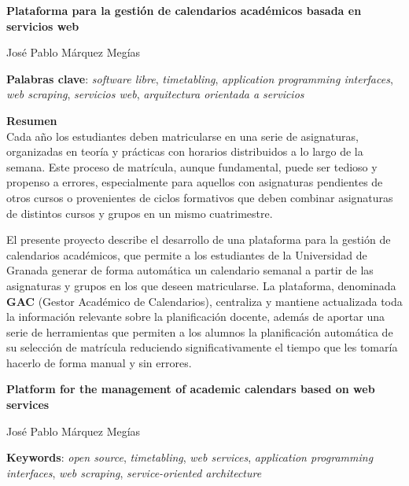 \thispagestyle{empty}

\begin{center}
	\newpage
{\large\bfseries Plataforma para la gestión de calendarios académicos basada en servicios web}\\
\end{center}
\begin{center}
José Pablo Márquez Megías\\
\end{center}


\vspace{0.5cm}
\noindent\textbf{Palabras clave}: \textit{software libre}, \textit{timetabling}, \textit{application programming interfaces}, \textit{web scraping}, \textit{servicios web}, \textit{arquitectura orientada a servicios}
\vspace{0.7cm}

\noindent\textbf{Resumen}\\

Cada año los estudiantes deben matricularse en una serie de asignaturas, organizadas en teoría y prácticas con horarios distribuidos a lo largo de la semana. Este proceso de matrícula, aunque fundamental, puede ser tedioso y propenso a errores, especialmente para aquellos con asignaturas pendientes de otros cursos o provenientes de ciclos formativos que deben combinar asignaturas de distintos cursos y grupos en un mismo cuatrimestre.\newline

El presente proyecto describe el desarrollo de una plataforma para la gestión de calendarios académicos, que permite a los estudiantes de la Universidad de Granada generar de forma automática un calendario semanal a partir de las asignaturas y grupos en los que deseen matricularse. La plataforma, denominada \textbf{GAC} (Gestor Académico de Calendarios), centraliza y mantiene actualizada toda la información relevante sobre la planificación docente, además de aportar una serie de herramientas que permiten a los alumnos la planificación automática de su selección de matrícula reduciendo significativamente el tiempo que les tomaría hacerlo de forma manual y sin errores.\newline

\cleardoublepage

\begin{center}
	{\large\bfseries Platform for the management of academic calendars based on web services}\\
\end{center}
\begin{center}
	José Pablo Márquez Megías\\
\end{center}
\vspace{0.5cm}
\noindent\textbf{Keywords}: \textit{open source}, \textit{timetabling}, \textit{web services}, \textit{application programming interfaces}, \textit{web scraping}, \textit{service-oriented architecture}
\vspace{0.7cm}

